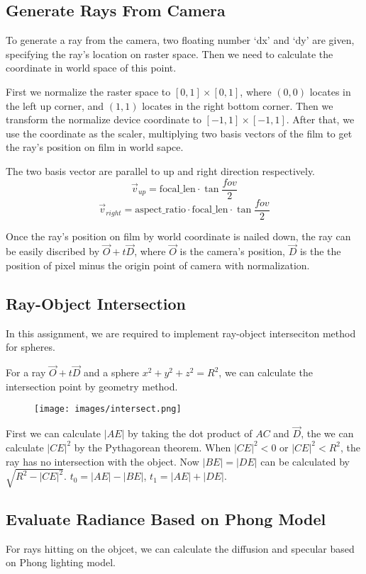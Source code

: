 \documentclass[acmtog]{acmart}
\begin{document}
\subsection{Generate Rays From Camera}
To generate a ray from the camera, two floating number `dx' and `dy' are given, specifying the ray's location on raster space. Then we need to calculate the coordinate in world space of this point.

First we normalize the raster space to $[0,1]\times[0,1]$, where $(0,0)$ locates in the left up corner, and $(1,1)$ locates in the right bottom corner. Then we transform the normalize device coordinate to $[-1,1]\times[-1,1]$. After that, we use the coordinate as the scaler, multiplying two basis vectors of the film to get the ray's position on film in world sapce.

The two basis vector are parallel to up and right direction respectively.
\[\vec{v}_{up} = \mathrm{focal\_len} \cdot \tan \frac{fov}{2}\]
\[\vec{v}_{right} = \mathrm{aspect\_ ratio} \cdot \mathrm{focal\_len} \cdot \tan \frac{fov}{2}\]

Once the ray's position on film by world coordinate is nailed down, the ray can be easily discribed by $\vec{O} + t\vec{D}$, where $\vec{O}$ is the camera's position, $\vec{D}$ is the the position of pixel minus the origin point of camera with normalization.

\subsection{Ray-Object Intersection}
In this assignment, we are required to implement ray-object interseciton method for spheres.

For a ray $\vec{O} + t\vec{D}$ and a sphere $x^2 + y^2 + z^2 = R^2$, we can calculate the intersection point by geometry method.
\begin{figure}[h]
    \centering
    \texttt{[image: images/intersect.png]}
\end{figure}
First we can calculate $|AE|$ by taking the dot product of $AC$ and $\vec{D}$, the we can calculate $|CE|^2$ by the Pythagorean theorem. When $|CE|^2 <0$ or $|CE|^2 < R^2$, the ray has no intersection with the object. Now $|BE| = |DE|$ can be calculated by $\sqrt{R^2 - |CE|^2}$.
$t_0 = |AE| - |BE|$, $t_1 = |AE| + |DE|$.

\subsection{Evaluate Radiance Based on Phong Model}
For rays hitting on the objcet, we can calculate the diffusion and specular based on Phong lighting model.
\end{document}
